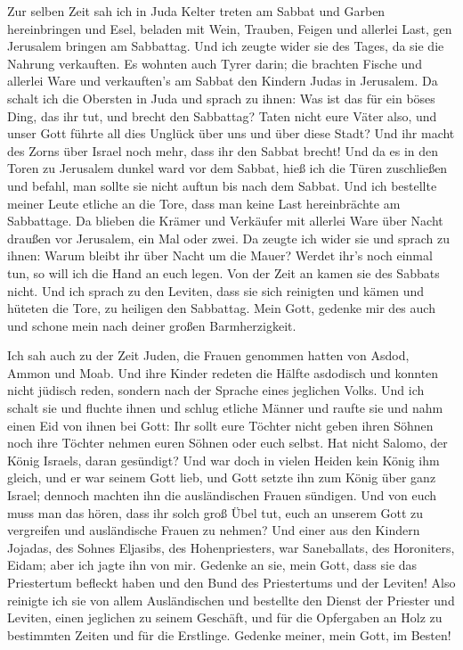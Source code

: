  Zur selben Zeit sah ich in Juda Kelter treten am Sabbat
und Garben hereinbringen und Esel, beladen mit Wein, Trauben, Feigen und
allerlei Last, gen Jerusalem bringen am Sabbattag. Und ich zeugte wider
sie des Tages, da sie die Nahrung verkauften.  Es wohnten
auch Tyrer darin; die brachten Fische und allerlei Ware und verkauften's
am Sabbat den Kindern Judas in Jerusalem.  Da schalt ich
die Obersten in Juda und sprach zu ihnen: Was ist das für ein böses
Ding, das ihr tut, und brecht den Sabbattag?  Taten nicht
eure Väter also, und unser Gott führte all dies Unglück über uns und
über diese Stadt? Und ihr macht des Zorns über Israel noch mehr, dass
ihr den Sabbat brecht!  Und da es in den Toren zu
Jerusalem dunkel ward vor dem Sabbat, hieß ich die Türen zuschließen und
befahl, man sollte sie nicht auftun bis nach dem Sabbat. Und ich
bestellte meiner Leute etliche an die Tore, dass man keine Last
hereinbrächte am Sabbattage.  Da blieben die Krämer und
Verkäufer mit allerlei Ware über Nacht draußen vor Jerusalem, ein Mal
oder zwei.  Da zeugte ich wider sie und sprach zu ihnen:
Warum bleibt ihr über Nacht um die Mauer? Werdet ihr's noch einmal tun,
so will ich die Hand an euch legen. Von der Zeit an kamen sie des
Sabbats nicht.  Und ich sprach zu den Leviten, dass sie
sich reinigten und kämen und hüteten die Tore, zu heiligen den
Sabbattag. Mein Gott, gedenke mir des auch und schone mein nach deiner
großen Barmherzigkeit.

 Ich sah auch zu der Zeit Juden, die Frauen genommen
hatten von Asdod, Ammon und Moab.  Und ihre Kinder
redeten die Hälfte asdodisch und konnten nicht jüdisch reden, sondern
nach der Sprache eines jeglichen Volks.  Und ich schalt
sie und fluchte ihnen und schlug etliche Männer und raufte sie und nahm
einen Eid von ihnen bei Gott: Ihr sollt eure Töchter nicht geben ihren
Söhnen noch ihre Töchter nehmen euren Söhnen oder euch selbst.
 Hat nicht Salomo, der König Israels, daran gesündigt?
Und war doch in vielen Heiden kein König ihm gleich, und er war seinem
Gott lieb, und Gott setzte ihn zum König über ganz Israel; dennoch
machten ihn die ausländischen Frauen sündigen.  Und von
euch muss man das hören, dass ihr solch groß Übel tut, euch an unserem
Gott zu vergreifen und ausländische Frauen zu nehmen? 
Und einer aus den Kindern Jojadas, des Sohnes Eljasibs, des
Hohenpriesters, war Saneballats, des Horoniters, Eidam; aber ich jagte
ihn von mir.  Gedenke an sie, mein Gott, dass sie das
Priestertum befleckt haben und den Bund des Priestertums und der
Leviten!  Also reinigte ich sie von allem Ausländischen
und bestellte den Dienst der Priester und Leviten, einen jeglichen zu
seinem Geschäft,  und für die Opfergaben an Holz zu
bestimmten Zeiten und für die Erstlinge. Gedenke meiner, mein Gott, im
Besten!
